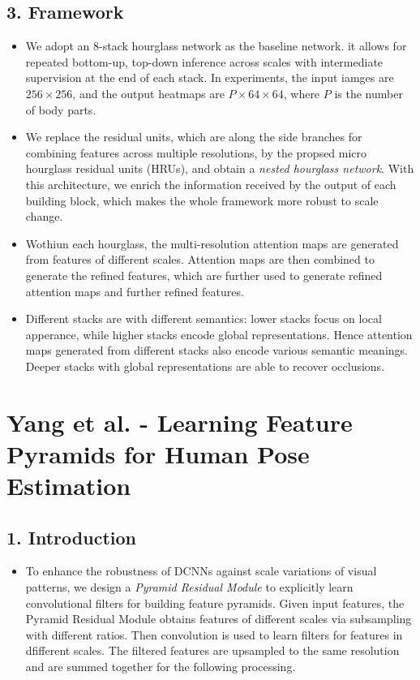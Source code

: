 \documentclass{report}
\begin{document}
\subsection*{3. Framework}
\begin{itemize}
    \item We adopt an 8-stack hourglass network as the baseline network. it allows for repeated bottom-up, top-down inference across scales with intermediate supervision at the end of each stack. In experiments, the input iamges are $256 \times 256$, and the output heatmaps are $P \times 64 \times 64$, where $P$ is the number of body parts.
    \item We replace the residual units, which are along the side branches for combining features across multiple resolutions, by the propsed micro hourglass residual units (HRUs), and obtain a \textit{nested hourglass network}. With this architecture, we enrich the information received by the output of each building block, which makes the whole framework more robust to scale change.
    \item Wothiun each hourglass, the multi-resolution attention maps are generated from features of different scales. Attention maps are then combined to generate the refined features, which are further used to generate refined attention maps and further refined features.
    \item Different stacks are with different semantics: lower stacks focus on local apperance, while higher stacks encode global representations. Hence attention maps generated from different stacks also encode various semantic meanings. Deeper stacks with global representations are able to recover occlusions.
\end{itemize}
\section*{Yang et al. - Learning Feature Pyramids for Human Pose Estimation}
\subsection*{1. Introduction}
\begin{itemize}
    \item To enhance the robustness of DCNNs against scale variations of visual patterns, we design a \textit{Pyramid Residual Module} to explicitly learn convolutional filters for building feature pyramids. Given input features, the Pyramid Residual Module obtains features of different scales via subsampling with different ratios. Then convolution is used to learn filters for features in dfifferent scales. The filtered features are upsampled to the same resolution and are summed together for the following processing. 
\end{itemize}
\end{document}
